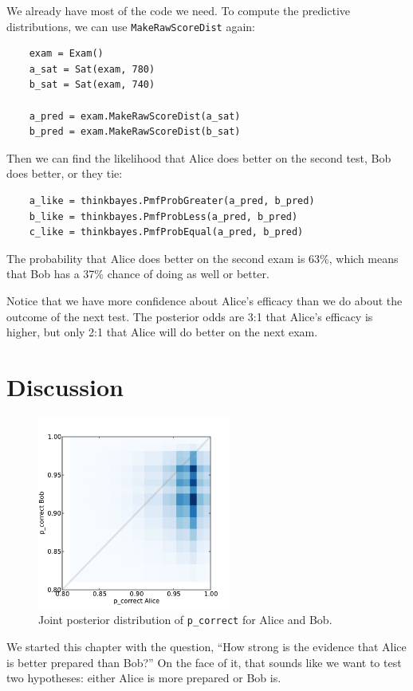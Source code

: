 \documentclass[12pt]{book}
\begin{document}
We already have most of the code we need.  To compute
the predictive distributions, we can use \verb"MakeRawScoreDist" again:

\begin{verbatim}
    exam = Exam()
    a_sat = Sat(exam, 780)
    b_sat = Sat(exam, 740)

    a_pred = exam.MakeRawScoreDist(a_sat)
    b_pred = exam.MakeRawScoreDist(b_sat)
\end{verbatim}

Then we can find the likelihood that Alice does better on the second
test, Bob does better, or they tie:

\begin{verbatim}
    a_like = thinkbayes.PmfProbGreater(a_pred, b_pred)
    b_like = thinkbayes.PmfProbLess(a_pred, b_pred)
    c_like = thinkbayes.PmfProbEqual(a_pred, b_pred)
\end{verbatim}

The probability that Alice does better on the second exam is 63\%,
which means that Bob has a 37\% chance of doing as well or better.

Notice that we have more confidence about Alice's efficacy than we do
about the outcome of the next test.  The posterior odds are 3:1 that
Alice's efficacy is higher, but only 2:1 that Alice will do better on
the next exam.


\section{Discussion}

\begin{figure}
\centerline{\includegraphics[height=2.5in]{figs/sat_joint.pdf}}
\caption{Joint posterior distribution of {\tt p\_correct} for Alice and Bob.}
\label{fig.satjoint}
\end{figure}

We started this chapter with the question,
``How strong is the evidence that Alice is better prepared
than Bob?''  On the face of it, that sounds like we want to
test two hypotheses: either Alice is more prepared or Bob is.
\end{document}
